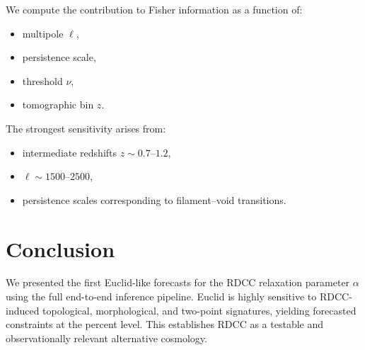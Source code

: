 \documentclass[11pt,a4paper]{article}
\begin{document}
We compute the contribution to Fisher information as a function of:

\begin{itemize}
    \item multipole $\ell$,
    \item persistence scale,
    \item threshold $\nu$,
    \item tomographic bin $z$.
\end{itemize}

The strongest sensitivity arises from:

\begin{itemize}
    \item intermediate redshifts $z \sim 0.7$--$1.2$,
    \item $\ell \sim 1500$--$2500$,
    \item persistence scales corresponding to filament–void transitions.
\end{itemize}
\section{Conclusion}

We presented the first Euclid-like forecasts for the RDCC relaxation parameter 
$\alpha$ using the full end-to-end inference pipeline. Euclid is highly sensitive 
to RDCC-induced topological, morphological, and two-point signatures, yielding 
forecasted constraints at the percent level. This establishes RDCC as a 
testable and observationally relevant alternative cosmology.


\nocite{*}

\end{document}
